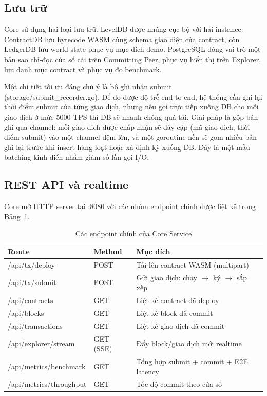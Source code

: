 \subsection{Lưu trữ}

Core sử dụng hai loại lưu trữ. LevelDB được nhúng cục bộ với hai instance:
ContractDB lưu bytecode WASM cùng schema giao diện của contract, còn
LedgerDB lưu world state phục vụ mục đích demo. PostgreSQL đóng vai
trò một bản sao chỉ-đọc của sổ cái trên Committing Peer, phục vụ hiển thị trên
Explorer, lưu danh mục contract và phục vụ đo benchmark.

Một chi tiết tối ưu đáng chú ý là bộ ghi nhận submit
(storage/submit\_recorder.go). Để đo được độ trễ end-to-end, hệ thống
cần ghi lại thời điểm submit của từng giao dịch, nhưng nếu gọi trực tiếp
xuống DB cho mỗi giao dịch ở mức 5000 TPS thì DB sẽ nhanh chóng quá tải. Giải
pháp là gộp bản ghi qua channel: mỗi giao dịch được chấp nhận sẽ đẩy cặp (mã
giao dịch, thời điểm submit) vào một channel đệm lớn, và một goroutine nền sẽ
gom nhiều bản ghi lại trước khi insert hàng loạt hoặc xả định kỳ xuống DB. Đây
là một mẫu batching kinh điển nhằm giảm số lần gọi I/O.

\subsection{REST API và realtime}

Core mở HTTP server tại :8080 với các nhóm endpoint chính được liệt kê
trong Bảng~\ref{tab:core-api}.

\begin{table}[H]
\centering
\caption{Các endpoint chính của Core Service}
\label{tab:core-api}
\begin{tabular}{@{}p{4.6cm}p{1.6cm}p{5.2cm}@{}}
\toprule
Route & Method & Mục đích \\
\midrule
/api/tx/deploy & POST & Tải lên contract WASM (multipart) \\
/api/tx/submit & POST & Gửi giao dịch: chạy $\rightarrow$ ký $\rightarrow$ sắp xếp \\
/api/contracts & GET & Liệt kê contract đã deploy \\
/api/blocks & GET & Liệt kê block đã commit \\
/api/transactions & GET & Liệt kê giao dịch đã commit \\
/api/explorer/stream & GET (SSE) & Đẩy block/giao dịch mới realtime \\
/api/metrics/benchmark & GET & Tổng hợp submit + commit + E2E latency \\
/api/metrics/throughput & GET & Tốc độ commit theo cửa sổ \\
\bottomrule
\end{tabular}
\end{table}

